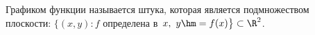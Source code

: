 
Графиком функции называется штука, которая является подмножеством плоскости: $\big\{(x,y)\colon f$ определена в~$x,\ y\hm=f(x)\big\}\subset \R^2$.
